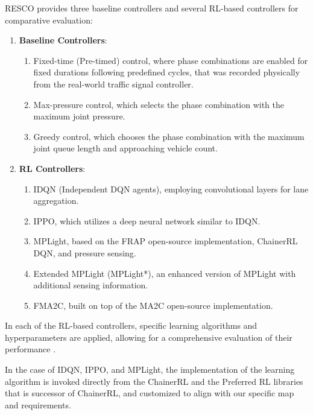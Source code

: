 RESCO provides three baseline controllers and several RL-based controllers for comparative evaluation:

\begin{enumerate}
    \item \textbf{Baseline Controllers}:
    \begin{enumerate}
        \item Fixed-time (Pre-timed) control, where phase combinations are enabled for fixed durations following predefined cycles, that was recorded physically from the real-world traffic signal controller.
        \item Max-pressure control, which selects the phase combination with the maximum joint pressure. \cite{chen2020toward}
        \item Greedy control, which chooses the phase combination with the maximum joint queue length and approaching vehicle count.\cite{ma2020feudal}
    \end{enumerate}
    
    \item \textbf{RL Controllers}:
    \begin{enumerate}
        \item IDQN (Independent DQN agents), employing convolutional layers for lane aggregation\cite{ault2020learning}.
        \item IPPO, which utilizes a deep neural network similar to IDQN\cite{ault2020learning}.
        \item MPLight, based on the FRAP open-source implementation, ChainerRL DQN\cite{ChainerRL}, and pressure sensing\cite{zheng2019learning}.
        \item Extended MPLight (MPLight*), an enhanced version of MPLight with additional sensing information.
        \item FMA2C, built on top of the MA2C open-source implementation\cite{chu2019multi}.
    \end{enumerate}
\end{enumerate}

In each of the RL-based controllers, specific learning algorithms and hyperparameters are applied, allowing for a comprehensive evaluation of their performance \cite{ault2020learning, chen2020toward, chu2019multi, ma2020feudal, zheng2019learning}.

In the case of IDQN, IPPO, and MPLight, the implementation of the learning algorithm is invoked directly from the ChainerRL \cite{ChainerRL} and the Preferred RL \cite{PFRL} libraries that is successor of ChainerRL, and customized to align with our specific map and requirements.

